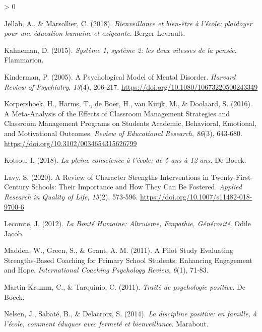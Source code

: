 \documentclass[
  french,
]{article}
\newlength{\cslhangindent}
\newenvironment{CSLReferences}[2] %
 {%
  \setlength{\parindent}{0pt}
  \ifodd #1 \everypar{\setlength{\hangindent}{\cslhangindent}}\ignorespaces\fi
  \ifnum #2 > 0
  \setlength{\parskip}{#2\baselineskip}
  \fi
 }%
 {}
\begin{document}
\begin{CSLReferences}{1}{0}
\leavevmode\hypertarget{ref-jellab2018}{}%
Jellab, A., \& Marsollier, C. (2018). \emph{{Bienveillance et bien-être à l'école: plaidoyer pour une éducation humaine et exigeante}}. {Berger-Levrault}.

\leavevmode\hypertarget{ref-kahneman2015}{}%
Kahneman, D. (2015). \emph{{Système 1, système 2: les deux vitesses de la pensée}}. {Flammarion}.

\leavevmode\hypertarget{ref-kinderman2005}{}%
Kinderman, P. (2005). A Psychological Model of Mental Disorder. \emph{Harvard Review of Psychiatry}, \emph{13}(4), 206‑217. \url{https://doi.org/10.1080/10673220500243349}

\leavevmode\hypertarget{ref-korpershoek2016}{}%
Korpershoek, H., Harms, T., de Boer, H., van Kuijk, M., \& Doolaard, S. (2016). A {Meta}-{Analysis} of the {Effects} of {Classroom Management Strategies} and {Classroom Management Programs} on {Students Academic}, {Behavioral}, {Emotional}, and {Motivational Outcomes}. \emph{Review of Educational Research}, \emph{86}(3), 643‑680. \url{https://doi.org/10.3102/0034654315626799}

\leavevmode\hypertarget{ref-kotsou2018}{}%
Kotsou, I. (2018). \emph{{La pleine conscience à l'école: de 5 ans à 12 ans.}} {De Boeck}.

\leavevmode\hypertarget{ref-lavy2020}{}%
Lavy, S. (2020). A {Review} of {Character Strengths Interventions} in {Twenty}-{First}-{Century Schools}: Their {Importance} and {How} They Can Be {Fostered}. \emph{Applied Research in Quality of Life}, \emph{15}(2), 573‑596. \url{https://doi.org/10.1007/s11482-018-9700-6}

\leavevmode\hypertarget{ref-lecomte2012c}{}%
Lecomte, J. (2012). \emph{La Bonté Humaine: {Altruisme}, Empathie, Générosité}. {Odile Jacob}.

\leavevmode\hypertarget{ref-madden2011}{}%
Madden, W., Green, S., \& Grant, A. M. (2011). A Pilot Study Evaluating Strengths-Based Coaching for Primary School Students: {Enhancing} Engagement and Hope. \emph{International Coaching Psychology Review}, \emph{6}(1), 71‑83.

\leavevmode\hypertarget{ref-martin-krumm2011}{}%
Martin-Krumm, C., \& Tarquinio, C. (2011). \emph{{Traité de psychologie positive}}. {De Boeck}.

\leavevmode\hypertarget{ref-nelsen2014}{}%
Nelsen, J., Sabaté, B., \& Delacroix, S. (2014). \emph{{La discipline positive: en famille, à l'école, comment éduquer avec fermeté et bienveillance}}. {Marabout}.


\end{CSLReferences}
\end{document}

